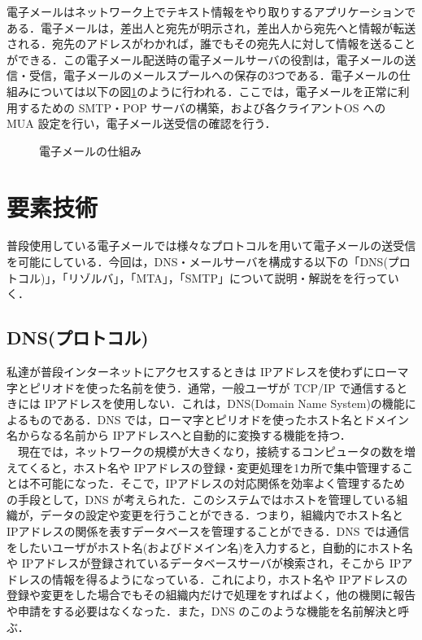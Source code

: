 \documentclass[a4j,titlepage]{jarticle}
\begin{document}
電子メールはネットワーク上でテキスト情報をやり取りするアプリケーションである．電子メールは，差出人と宛先が明示され，差出人から宛先へと情報が転送される．宛先のアドレスがわかれば，誰でもその宛先人に対して情報を送ることができる．この電子メール配送時の電子メールサーバの役割は，電子メールの送信・受信，電子メールのメールスプールへの保存の3つである．電子メールの仕組みについては以下の図\ref{fig:mail}のように行われる．ここでは，電子メールを正常に利用するための SMTP・POP サーバの構築，および各クライアントOS への MUA 設定を行い，電子メール送受信の確認を行う．

  \begin{figure}[htbp]
    \begin{center}
      \caption{電子メールの仕組み}
     \label{fig:mail}
   \end{center}
  \end{figure}


\section{要素技術}
普段使用している電子メールでは様々なプロトコルを用いて電子メールの送受信を可能にしている．今回は，DNS・メールサーバを構成する以下の「DNS(プロトコル)」，「リゾルバ」，「MTA」，「SMTP」について説明・解説をを行っていく．

\subsection{DNS(プロトコル)\cite{bib:iptext}}
私達が普段インターネットにアクセスするときは IPアドレスを使わずにローマ字とピリオドを使った名前を使う．通常，一般ユーザが TCP/IP で通信するときには IPアドレスを使用しない．これは，DNS(Domain Name System)の機能によるものである．DNS では，ローマ字とピリオドを使ったホスト名とドメイン名からなる名前から IPアドレスへと自動的に変換する機能を持つ．\\
　現在では，ネットワークの規模が大きくなり，接続するコンピュータの数を増えてくると，ホスト名や IPアドレスの登録・変更処理を1カ所で集中管理することは不可能になった．そこで，IPアドレスの対応関係を効率よく管理するための手段として，DNS が考えられた．このシステムではホストを管理している組織が，データの設定や変更を行うことができる．つまり，組織内でホスト名と IPアドレスの関係を表すデータベースを管理することができる．DNS では通信をしたいユーザがホスト名(およびドメイン名)を入力すると，自動的にホスト名や IPアドレスが登録されているデータベースサーバが検索され，そこから IPアドレスの情報を得るようになっている．これにより，ホスト名や IPアドレスの登録や変更をした場合でもその組織内だけで処理をすればよく，他の機関に報告や申請をする必要はなくなった．また，DNS のこのような機能を名前解決と呼ぶ．\\
\end{document}
